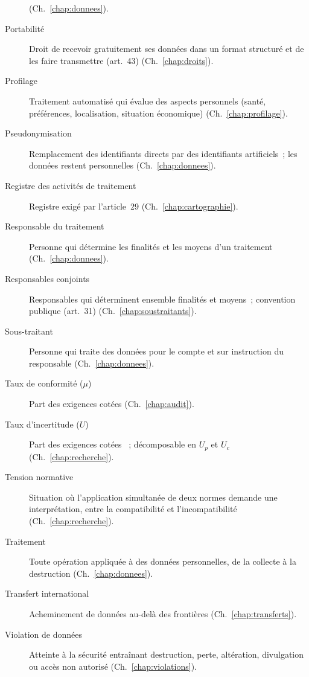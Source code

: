 \begin{description}
          (Ch.~\ref{chap:donnees}).
    \item[Portabilité] Droit de recevoir gratuitement ses données dans un
          format structuré et de les faire transmettre (art.~43)
          (Ch.~\ref{chap:droits}).
    \item[Profilage] Traitement automatisé qui évalue des aspects personnels
          (santé, préférences, localisation, situation économique)
          (Ch.~\ref{chap:profilage}).
    \item[Pseudonymisation] Remplacement des identifiants directs par des
          identifiants artificiels~; les données restent personnelles
          (Ch.~\ref{chap:donnees}).
    \item[Registre des activités de traitement] Registre exigé par
          l'article~29 (Ch.~\ref{chap:cartographie}).
    \item[Responsable du traitement] Personne qui détermine les finalités et
          les moyens d'un traitement (Ch.~\ref{chap:donnees}).
    \item[Responsables conjoints] Responsables qui déterminent ensemble
          finalités et moyens~; convention publique (art.~31)
          (Ch.~\ref{chap:soustraitants}).
    \item[Sous-traitant] Personne qui traite des données pour le compte et
          sur instruction du responsable (Ch.~\ref{chap:donnees}).
    \item[Taux de conformité ($\mu$)] Part des exigences cotées \OUI{}
          (Ch.~\ref{chap:audit}).
    \item[Taux d'incertitude ($U$)] Part des exigences cotées \NEK{}~;
          décomposable en $U_p$ et $U_c$ (Ch.~\ref{chap:recherche}).
    \item[Tension normative] Situation où l'application simultanée de deux
          normes demande une interprétation, entre la compatibilité et
          l'incompatibilité (Ch.~\ref{chap:recherche}).
    \item[Traitement] Toute opération appliquée à des données personnelles,
          de la collecte à la destruction (Ch.~\ref{chap:donnees}).
    \item[Transfert international] Acheminement de données au-delà des
          frontières (Ch.~\ref{chap:transferts}).
    \item[Violation de données] Atteinte à la sécurité entraînant
          destruction, perte, altération, divulgation ou accès non autorisé
          (Ch.~\ref{chap:violations}).
\end{description}
